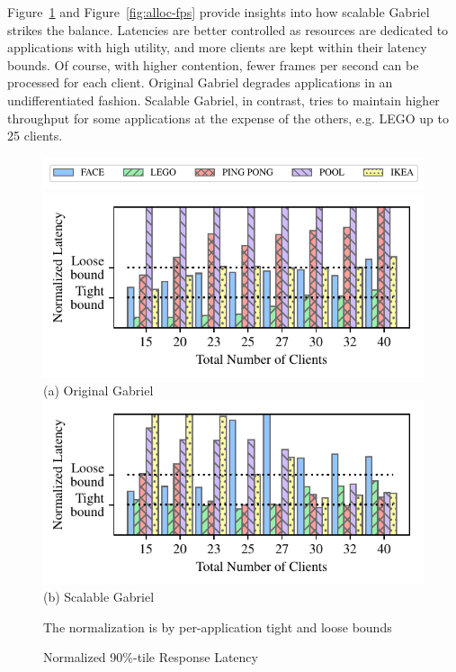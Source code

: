 Figure~\ref{fig:alloc-latency} and Figure~\ref{fig:alloc-fps} provide insights
into how scalable Gabriel strikes the balance. Latencies are better controlled
as resources are dedicated to applications with high utility, and more clients
are kept within their latency bounds. Of course, with higher contention, fewer
frames per second can be processed for each client. Original Gabriel degrades
applications in an undifferentiated fashion. Scalable Gabriel, in contrast,
tries to maintain higher throughput for some applications at the expense of the
others, e.g. LEGO up to 25 clients.

\begin{figure}[]
  \begin{center}
    \includegraphics[width=\linewidth]{FIGS/fig-alloc-latency-legend.pdf}
    \includegraphics[width=\linewidth]{FIGS/fig-alloc-latency-baseline.pdf}
    {(a) Original Gabriel}
    \includegraphics[width=\linewidth]{FIGS/fig-alloc-latency-cpushares.pdf}
    {(b) Scalable Gabriel}
  \end{center}
\begin{captiontext}
  \centering
The normalization is  by per-application tight and loose bounds~\cite{chen2017empirical}
\end{captiontext}
  \caption{Normalized 90\%-tile Response Latency}
  \label{fig:alloc-latency}
\end{figure}

